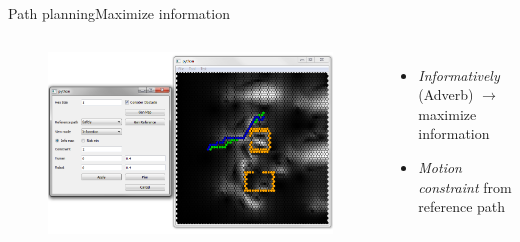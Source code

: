 \begin{frame}{Path planning}{Maximize information}

\begin{columns}
\begin{figure}
\centering
\includegraphics[width = \textwidth]{./screenshot/info_max_path.png}
\end{figure}

\begin{minipage}{\textwidth}
\begin{itemize}
\item \emph{Informatively} (Adverb) $ \rightarrow $ maximize information
\item \emph{Motion constraint} from reference path
\end{itemize}
\end{minipage}
\end{columns}

\end{frame}

